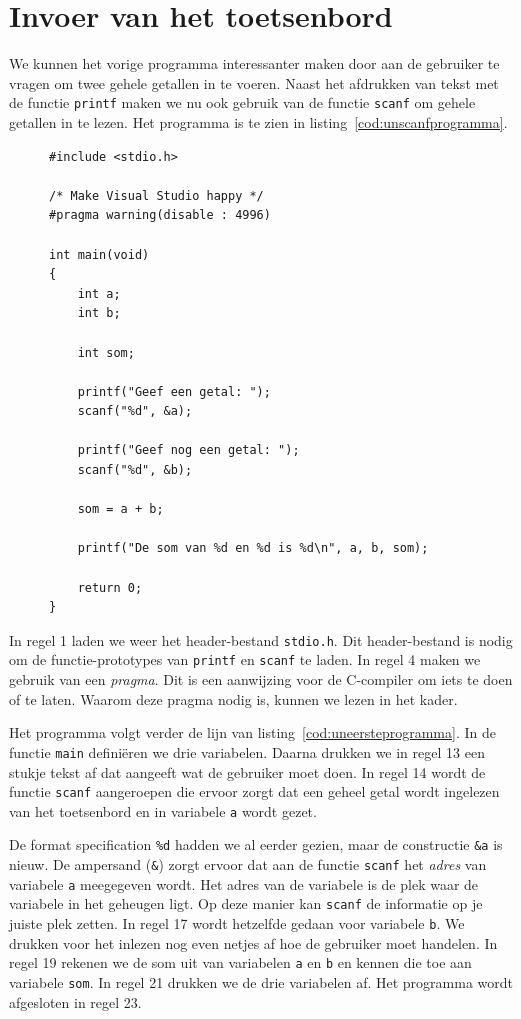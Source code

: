 \section{Invoer van het toetsenbord}
We kunnen het vorige programma interessanter maken door aan de gebruiker te vragen om twee gehele getallen in te voeren. Naast het afdrukken van tekst met de functie \texttt{printf} maken we nu ook gebruik van de functie \texttt{scanf} om gehele getallen in te lezen. Het programma is te zien in listing~\ref{cod:unscanfprogramma}.

\begin{figure}[!ht]
\begin{lstlisting}[caption=Invoer van de gebruiker opvragen.,label=cod:unscanfprogramma]
#include <stdio.h>

/* Make Visual Studio happy */
#pragma warning(disable : 4996)

int main(void) 
{
    int a;
    int b;

    int som;

    printf("Geef een getal: ");
    scanf("%d", &a);

    printf("Geef nog een getal: ");
    scanf("%d", &b);

    som = a + b;

    printf("De som van %d en %d is %d\n", a, b, som);

    return 0;
}
\end{lstlisting}
\end{figure}

In regel 1 laden we weer het header-bestand \texttt{stdio.h}. Dit header-bestand is nodig om de functie-prototypes van \texttt{printf} en \texttt{scanf} te laden. In regel 4 maken we gebruik van een \textsl{pragma}. Dit is een aanwijzing voor de C-compiler om iets te doen of te laten. Waarom deze pragma nodig is, kunnen we lezen in het kader.%

Het programma volgt verder de lijn van listing~\ref{cod:uneersteprogramma}. In de functie \texttt{main} definiëren we drie variabelen. Daarna drukken we in regel 13 een stukje tekst af dat aangeeft wat de gebruiker moet doen. In regel 14 wordt de functie \texttt{scanf} aangeroepen die ervoor zorgt dat een geheel getal wordt ingelezen van het toetsenbord en in variabele \texttt{a} wordt gezet.

De format specification \texttt{\%d} hadden we al eerder gezien, maar de constructie \texttt{\&a} is nieuw. De ampersand (\texttt{\&}) zorgt ervoor dat aan de functie \texttt{scanf} het \textsl{adres} van variabele \texttt{a} meegegeven wordt. Het adres van de variabele is de plek waar de variabele in het geheugen ligt. Op deze manier kan \texttt{scanf} de informatie op je juiste plek zetten. In regel 17 wordt hetzelfde gedaan voor variabele \texttt{b}. We drukken voor het inlezen nog even netjes af hoe de gebruiker moet handelen. In regel 19 rekenen we de som uit van variabelen \texttt{a} en \texttt{b} en kennen die toe aan variabele \texttt{som}. In regel 21 drukken we de drie variabelen af. Het programma wordt afgesloten in regel 23.

